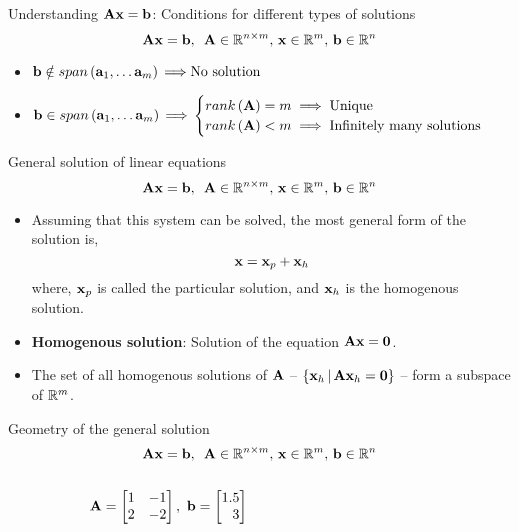 \documentclass[aspectratio=169]{beamer}
\let\olditem\item
\renewcommand{\item}{\setlength{\itemsep}{\fill}\olditem}
\def\mf{\ensuremath\mathbf}
\def\mb{\ensuremath\mathbb}
\def\lp{\ensuremath\left(}
\def\rp{\ensuremath\right)}
\def\lc{\ensuremath\left\{}
\def\rc{\ensuremath\right\}}
\def\bmx{\ensuremath\begin{bmatrix*}[r]}
\def\emx{\ensuremath\end{bmatrix*}}
\begin{document}
\begin{frame}[t]{Understanding $\mf{A}\mf{x} = \mf{b}$: Conditions for different types of solutions}
\[ \mf{A}\mf{x} = \mf{b}, \,\,\, \mf{A} \in \mb{R}^{n \times m}, \, \mf{x} \in \mb{R}^m, \, \mf{b} \in \mb{R}^n \]
\vspace{0.5cm}
\begin{itemize}
  \item $\mf{b} \notin span\lp \mf{a}_1, \ldots \mf{a}_m \rp {\implies} \text{No solution}$
  \vspace{-2cm}
  \item $\mf{b} \in span\lp \mf{a}_1, \ldots \mf{a}_m \rp {\implies} \begin{cases}
        rank\lp \mf{A} \rp = m \implies \text{Unique} \\
        rank\lp \mf{A} \rp < m \implies \text{Infinitely many solutions}
        \end{cases}$
\end{itemize}
\end{frame}

\begin{frame}[t]{General solution of linear equations}
\[ \mf{A}\mf{x} = \mf{b}, \,\,\, \mf{A} \in \mb{R}^{n \times m}, \, \mf{x} \in \mb{R}^m, \, \mf{b} \in \mb{R}^n \]

\begin{itemize}
  \item Assuming that this system can be solved, the most general form of the solution is,
  \[ \mf{x} = \mf{x}_p + \mf{x}_h \]
  where, $\mf{x}_p$ is called the particular solution, and $\mf{x}_h$ is the homogenous solution.

  \item \textbf{Homogenous solution}: Solution of the equation $\mf{A}\mf{x} = \mf{0}$.

  \item The set of all homogenous solutions of $\mf{A}$ -- $\lc \mf{x}_h \, \vert \, \mf{A}\mf{x}_h = \mf{0} \rc$ -- form a subspace of $\mb{R}^m$.
\end{itemize}
\end{frame}

\begin{frame}[t]{Geometry of the general solution}
\[ \mf{A}\mf{x} = \mf{b}, \,\,\, \mf{A} \in \mb{R}^{n \times m}, \, \mf{x} \in \mb{R}^m, \, \mf{b} \in \mb{R}^n \]
\begin{columns}[t]
\begin{column}{0.3\textwidth}
\[ \mf{A} = \bmx
1 & -1\\
2 & -2
\emx, \,\, \mf{b} = \bmx
1.5\\
3
\emx \]
\end{column}
\hspace{0.5cm}
\begin{column}{0.6\textwidth}
\end{column}
\end{columns}
\end{frame}
\end{document}
